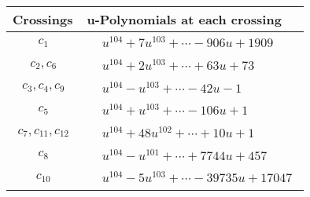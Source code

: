 \documentclass[1p]{elsarticle_modified}
\theoremstyle{definition}
\begin{document}
\begin{tabular}{m{50pt}|m{274pt}}
Crossings & \hspace{64pt}u-Polynomials at each crossing \\
\hline $$\begin{aligned}c_{1}\end{aligned}$$&$\begin{aligned}
&u^{104}+7 u^{103}+\cdots-906 u+1909
\end{aligned}$\\
\hline $$\begin{aligned}c_{2},c_{6}\end{aligned}$$&$\begin{aligned}
&u^{104}+2 u^{103}+\cdots+63 u+73
\end{aligned}$\\
\hline $$\begin{aligned}c_{3},c_{4},c_{9}\end{aligned}$$&$\begin{aligned}
&u^{104}- u^{103}+\cdots-42 u-1
\end{aligned}$\\
\hline $$\begin{aligned}c_{5}\end{aligned}$$&$\begin{aligned}
&u^{104}+u^{103}+\cdots-106 u+1
\end{aligned}$\\
\hline $$\begin{aligned}c_{7},c_{11},c_{12}\end{aligned}$$&$\begin{aligned}
&u^{104}+48 u^{102}+\cdots+10 u+1
\end{aligned}$\\
\hline $$\begin{aligned}c_{8}\end{aligned}$$&$\begin{aligned}
&u^{104}- u^{101}+\cdots+7744 u+457
\end{aligned}$\\
\hline $$\begin{aligned}c_{10}\end{aligned}$$&$\begin{aligned}
&u^{104}-5 u^{103}+\cdots-39735 u+17047
\end{aligned}$\\
\hline
\end{tabular}\\~\\
\newpage\renewcommand{\arraystretch}{1}
\end{document}
